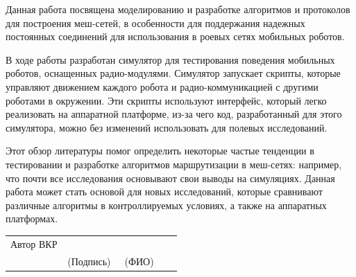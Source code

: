 \documentclass[%
]{report}
\begin{document}
Данная работа посвящена моделированию и разработке алгоритмов и протоколов
для построения меш-сетей, в особенности для поддержания надежных
постоянных соединений для
использования в роевых сетях мобильных роботов.

В ходе работы разработан симулятор для тестирования поведения мобильных роботов,
оснащенных радио-модулями.
Симулятор запускает скрипты, которые управляют движением каждого робота и
радио-коммуникацией с другими роботами в окружении.
Эти скрипты используют интерфейс,
который легко реализовать на аппаратной платформе,
из-за чего код, разработанный для этого симулятора,
можно без изменений использовать для полевых исследований.

Этот обзор литературы помог определить некоторые частые тенденции в тестировании
и разработке алгоритмов маршрутизации в меш-сетях:
например, что почти все исследования основывают свои выводы на симуляциях.
Данная работа может стать основой для новых исследований,
которые сравнивают различные алгоритмы в контроллируемых условиях,
а также на аппаратных платформах.

\vspace*{\fill}

\noindent \begin{tabular}{p{0.33\linewidth} p{0.33\linewidth} p{0.33\linewidth}}
Автор ВКР & \underline{\phantom{signature sign}} & \underline{\phantom{Генералов Даниил}} \\
& (Подпись) & (ФИО)
\end{tabular}

\thispagestyle{empty} 

\newpage


\setcounter{page}{3}  

\tableofcontents

\newpage



\end{document}
